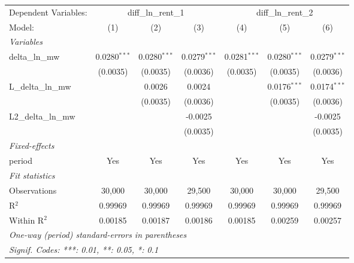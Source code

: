 \begin{tabular}{lcccccc}
\tabularnewline\toprule\toprule
Dependent Variables:&\multicolumn{3}{c}{diff\_ln\_rent\_1}&\multicolumn{3}{c}{diff\_ln\_rent\_2}\\
Model:&(1) & (2) & (3) & (4) & (5) & (6)\\
\midrule
\emph{Variables}&  & & & & & \\
delta\_ln\_mw&0.0280$^{***}$&0.0280$^{***}$&0.0279$^{***}$&0.0281$^{***}$&0.0280$^{***}$&0.0279$^{***}$\\
  &(0.0035)&(0.0035)&(0.0036)&(0.0035)&(0.0035)&(0.0036)\\
L\_delta\_ln\_mw&  &0.0026&0.0024&  &0.0176$^{***}$&0.0174$^{***}$\\
  &  &(0.0035)&(0.0036)&  &(0.0035)&(0.0036)\\
L2\_delta\_ln\_mw&  &  &-0.0025&  &  &-0.0025\\
  &  &  &(0.0035)&  &  &(0.0035)\\
\midrule
\emph{Fixed-effects}&  & & & & & \\
period&Yes&Yes&Yes&Yes&Yes&Yes\\
\midrule
\emph{Fit statistics}&  & & & & & \\
Observations& 30,000&30,000&29,500&30,000&30,000&29,500\\
R$^2$ & 0.99969&0.99969&0.99969&0.99969&0.99969&0.99969\\
Within R$^2$ & 0.00185&0.00187&0.00186&0.00185&0.00259&0.00257\\
\bottomrule\bottomrule
\multicolumn{7}{l}{\emph{One-way (period) standard-errors in parentheses}}\\
\multicolumn{7}{l}{\emph{Signif. Codes: ***: 0.01, **: 0.05, *: 0.1}}\\
\end{tabular}
